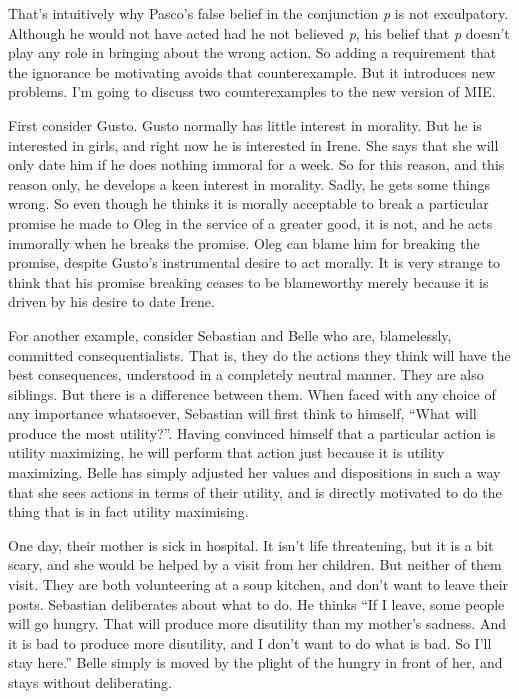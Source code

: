 That's intuitively why \gls{Pasco}'s false belief in the conjunction \emph{p} is not exculpatory. Although he would not have acted had he not believed \emph{p}, his belief that \emph{p} doesn't play any role in bringing about the wrong action. So adding a requirement that the ignorance be motivating avoids that counterexample. But it introduces new problems. I'm going to discuss two counterexamples to the new version of MIE.

First consider \gls{Gusto}. \gls{Gusto} normally has little interest in morality. But he is interested in girls, and right now he is interested in \gls{Irene}. She says that she will only date him if he does nothing immoral for a week. So for this reason, and this reason only, he develops a keen interest in morality. Sadly, he gets some things wrong. So even though he thinks it is morally acceptable to break a particular promise he made to \gls{Oleg} in the service of a greater good, it is not, and he acts immorally when he breaks the promise. \gls{Oleg} can blame him for breaking the promise, despite \gls{Gusto}'s instrumental desire to act morally. It is very strange to think that his promise breaking ceases to be blameworthy merely because it is driven by his desire to date \gls{Irene}.

For another example, consider \gls{Sebastian} and \gls{Belle} who are, blamelessly, committed consequentialists. That is, they do the actions they think will have the best consequences, understood in a completely neutral manner. They are also siblings. But there is a difference between them. When faced with any choice of any importance whatsoever, \gls{Sebastian} will first think to himself, ``What will produce the most utility?''. Having convinced himself that a particular action is utility maximizing, he will perform that action just because it is utility maximizing. \gls{Belle} has simply adjusted her values and dispositions in such a way that she sees actions in terms of their utility, and is directly motivated to do the thing that is in fact utility maximising.

One day, their mother is sick in hospital. It isn't life threatening, but it is a bit scary, and she would be helped by a visit from her children. But neither of them visit. They are both volunteering at a soup kitchen, and don't want to leave their posts. \gls{Sebastian} deliberates about what to do. He thinks ``If I leave, some people will go hungry. That will produce more disutility than my mother's sadness. And it is bad to produce more disutility, and I don't want to do what is bad. So I'll stay here.'' \gls{Belle} simply is moved by the plight of the hungry in front of her, and stays without deliberating.

